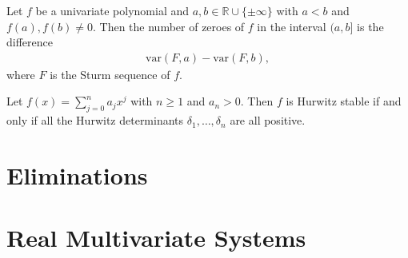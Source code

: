 \documentclass[12pt]{amsart}
\theoremstyle{definition}
\begin{document}
\theorem[Sturm]
Let $f$ be a univariate polynomial and $a,b\in \mathbb{R}\cup\{\pm\infty\}$ with $a<b$ and $f(a),f(b)\neq 0$. Then the number of zeroes of $f$ in the interval $(a,b]$ is the difference 
\begin{align*}
\text{var}(F,a) - \text{var}(F,b),
\end{align*}
where $F$ is the Sturm sequence of $f$.

\theorem
Let $f(x) = \sum_{j=0}^{n}a_{j}x^{j}$ with $n\geq 1$ and $a_{n}>0$. Then $f$ is Hurwitz stable if and only if all the Hurwitz determinants $\delta_{1},\dots,\delta_{n}$ are all positive.
%
%

\section{Eliminations}
%


\section{Real Multivariate Systems}
%



%

\end{document}
